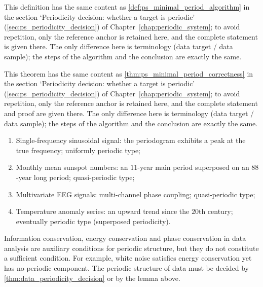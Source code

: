 \begin{definition}\label{def:data_minimal_period_algorithm}
This definition has the same content as \cref{def:ps_minimal_period_algorithm} in the section `Periodicity decision: whether a target is periodic' (\cref{sec:ps_periodicity_decision}) of Chapter~\ref{chap:periodic_system}; to avoid repetition, only the reference anchor is retained here, and the complete statement is given there. The only difference here is terminology (data target / data sample); the steps of the algorithm and the conclusion are exactly the same.
\end{definition}

\begin{theorem}\label{thm:data_minimal_period_correctness}
This theorem has the same content as \cref{thm:ps_minimal_period_correctness} in the section `Periodicity decision: whether a target is periodic' (\cref{sec:ps_periodicity_decision}) of Chapter~\ref{chap:periodic_system}; to avoid repetition, only the reference anchor is retained here, and the complete statement and proof are given there. The only difference here is terminology (data target / data sample); the steps of the algorithm and the conclusion are exactly the same.
\end{theorem}

\begin{example}\label{ex:data_periodic_examples}
\begin{enumerate}[label=(\roman*)]
    \item Single-frequency sinusoidal signal: the periodogram exhibits a peak at the true frequency; uniformly periodic type;
    \item Monthly mean sunspot numbers: an $11$-year main period superposed on an $88$-year long period; quasi-periodic type;
    \item Multivariate EEG signals: multi-channel phase coupling; quasi-periodic type;
    \item Temperature anomaly series: an upward trend since the $20$th century; eventually periodic type (superposed periodicity).
\end{enumerate}
\end{example}

\begin{remark}\label{rem:data_invariant_not_period}
Information conservation, energy conservation and phase conservation in data analysis are auxiliary conditions for periodic structure, but they do not constitute a sufficient condition. For example, white noise satisfies energy conservation yet has no periodic component. The periodic structure of data must be decided by \cref{thm:data_periodicity_decision} or by the lemma above.
\end{remark}

